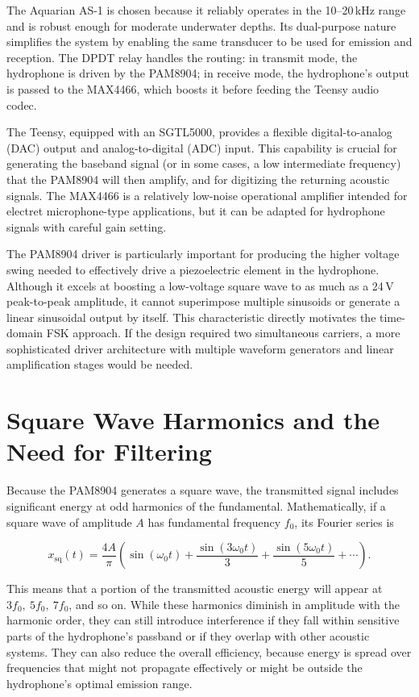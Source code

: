 The Aquarian AS-1 is chosen because it reliably operates in the 10--20\,kHz range and is robust enough for moderate underwater depths. Its dual-purpose nature simplifies the system by enabling the same transducer to be used for emission and reception. The DPDT relay handles the routing: in transmit mode, the hydrophone is driven by the PAM8904; in receive mode, the hydrophone's output is passed to the MAX4466, which boosts it before feeding the Teensy audio codec. 

The Teensy, equipped with an SGTL5000, provides a flexible digital-to-analog (DAC) output and analog-to-digital (ADC) input. This capability is crucial for generating the baseband signal (or in some cases, a low intermediate frequency) that the PAM8904 will then amplify, and for digitizing the returning acoustic signals. The MAX4466 is a relatively low-noise operational amplifier intended for electret microphone-type applications, but it can be adapted for hydrophone signals with careful gain setting. 

The PAM8904 driver is particularly important for producing the higher voltage swing needed to effectively drive a piezoelectric element in the hydrophone. Although it excels at boosting a low-voltage square wave to as much as a 24\,V peak-to-peak amplitude, it cannot superimpose multiple sinusoids or generate a linear sinusoidal output by itself. This characteristic directly motivates the time-domain FSK approach. If the design required two simultaneous carriers, a more sophisticated driver architecture with multiple waveform generators and linear amplification stages would be needed.

\section{Square Wave Harmonics and the Need for Filtering}

Because the PAM8904 generates a square wave, the transmitted signal includes significant energy at odd harmonics of the fundamental. Mathematically, if a square wave of amplitude \(A\) has fundamental frequency \(f_0\), its Fourier series is

\[
x_{\text{sq}}(t) = \frac{4A}{\pi} 
\left(\sin(\omega_0 t) + \frac{\sin(3\omega_0 t)}{3} + \frac{\sin(5\omega_0 t)}{5} + \cdots \right).
\]

This means that a portion of the transmitted acoustic energy will appear at \(3f_0,\ 5f_0,\ 7f_0\), and so on. While these harmonics diminish in amplitude with the harmonic order, they can still introduce interference if they fall within sensitive parts of the hydrophone's passband or if they overlap with other acoustic systems. They can also reduce the overall efficiency, because energy is spread over frequencies that might not propagate effectively or might be outside the hydrophone's optimal emission range.

